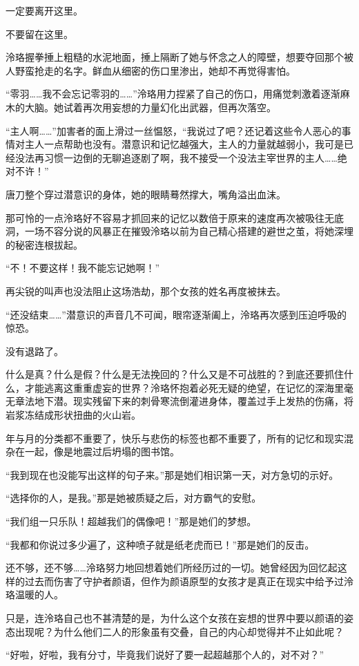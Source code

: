 \documentclass[UTF8, scheme = chinese, openany]{ctexbook}
\begin{document}
一定要离开这里。

不要留在这里。

泠珞握拳捶上粗糙的水泥地面，捶上隔断了她与怀念之人的障壁，想要夺回那个被人野蛮抢走的名字。鲜血从细密的伤口里渗出，她却不再觉得害怕。

“零羽……我不会忘记零羽的……”泠珞用力捏紧了自己的伤口，用痛觉刺激着逐渐麻木的大脑。她试着再次用妄想的力量幻化出武器，但再次落空。

“主人啊……”加害者的面上滑过一丝愠怒，“我说过了吧？还记着这些令人恶心的事情对主人一点帮助也没有。潜意识和记忆越强大，主人的力量就越弱小，我可是已经没法再习惯一边倒的无聊追逐剧了啊，我不接受一个没法主宰世界的主人……绝对不许！”

唐刀整个穿过潜意识的身体，她的眼睛蓦然撑大，嘴角溢出血沫。

那可怜的一点泠珞好不容易才抓回来的记忆以数倍于原来的速度再次被吸往无底洞，一场不容分说的风暴正在摧毁泠珞以前为自己精心搭建的避世之茧，将她深埋的秘密连根拔起。

“不！不要这样！我不能忘记她啊！”

再尖锐的叫声也没法阻止这场浩劫，那个女孩的姓名再度被抹去。

“还没结束……”潜意识的声音几不可闻，眼帘逐渐阖上，泠珞再次感到压迫呼吸的惊恐。

没有退路了。

什么是真？什么是假？什么是无法挽回的？什么又是不可战胜的？到底还要抓住什么，才能逃离这重重虚妄的世界？泠珞怀抱着必死无疑的绝望，在记忆的深海里毫无章法地下潜。现实残留下来的刺骨寒流倒灌进身体，覆盖过手上发热的伤痛，将岩浆冻结成形状扭曲的火山岩。

年与月的分类都不重要了，快乐与悲伤的标签也都不重要了，所有的记忆和现实混杂在一起，像是地震过后坍塌的图书馆。

“我到现在也没能写出这样的句子来。”那是她们相识第一天，对方急切的示好。

“选择你的人，是我。”那是她被质疑之后，对方霸气的安慰。

“我们组一只乐队！超越我们的偶像吧！”那是她们的梦想。

“我都和你说过多少遍了，这种喷子就是纸老虎而已！”那是她们的反击。

还不够，还不够……泠珞努力地回想着她们所经历过的一切。她曾经因为回忆起这样的过去而伤害了守护者颜语，但作为颜语原型的女孩才是真正在现实中给予过泠珞温暖的人。

只是，连泠珞自己也不甚清楚的是，为什么这个女孩在妄想的世界中要以颜语的姿态出现呢？为什么他们二人的形象虽有交叠，自己的内心却觉得并不止如此呢？

“好啦，好啦，我有分寸，毕竟我们说好了要一起超越那个人的，对不对？”
\end{document}
